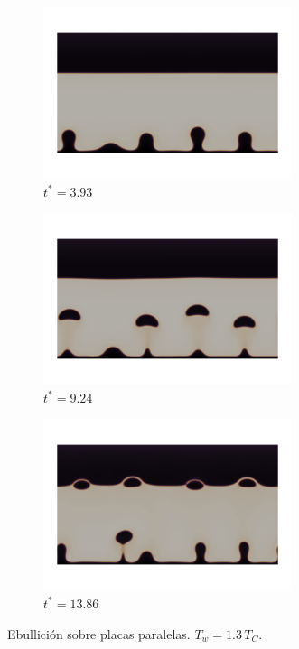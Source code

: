


\begin{figure}[htb]
    \centering
    \begin{subfigure}[t]{0.9\textwidth}
        \centering
        \includegraphics[width=0.8\textwidth]{Imagenes/HetBoiling/Placas7/t_140k}   
        \vspace{-10mm}
        \caption{$t^*=3.93$}     
    \end{subfigure}
    \begin{subfigure}[t]{0.9\textwidth}
        \centering
        \includegraphics[width=0.8\textwidth]{Imagenes/HetBoiling/Placas7/t_160k}
        \vspace{-10mm}
        \caption{$t^*=9.24$}
    \end{subfigure}
    \begin{subfigure}[t]{0.9\textwidth}
        \centering
        \includegraphics[width=0.8\textwidth]{Imagenes/HetBoiling/Placas7/t_200k}
        \vspace{-10mm}
        \caption{$t^*=13.86$}
    \end{subfigure}    
    \caption{Ebullici\'on sobre placas paralelas. $T_w=1.3\,T_C$.}
    \label{fig:film}
\end{figure}
